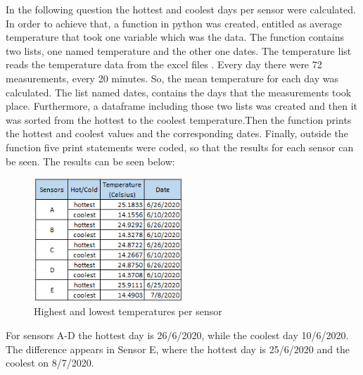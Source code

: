 \documentclass[a4paper,12pt]{article} %
\begin{document}
In the following question the hottest and coolest days per sensor were calculated. In order to achieve that, a function in python was created, entitled as average temperature that took one variable which was the data. The function contains two lists, one named temperature and the other one dates. The temperature list reads the temperature data from the excel files \cite{Maiullari2020}. Every day there were 72 measurements, every 20 minutes. So, the mean temperature for each day was calculated. The list named dates, contains the days that the measurements took place. Furthermore, a dataframe including those two lists was created and then it was sorted from the hottest to the coolest temperature.Then the function prints the hottest and coolest values and the corresponding dates. Finally, outside the function five print statements were coded, so that the results for each sensor can be seen. The results can be seen below:

\begin{figure}[H] %
	\centering %
	\includegraphics[width=0.5\textwidth]{Bonus.png} 
	\caption{Highest and lowest temperatures per sensor} %
\end{figure}

For sensors A-D the hottest day is 26/6/2020, while the coolest day 10/6/2020. The difference appears in Sensor E, where the hottest day is 25/6/2020 and the coolest on 8/7/2020.



\end{document}
